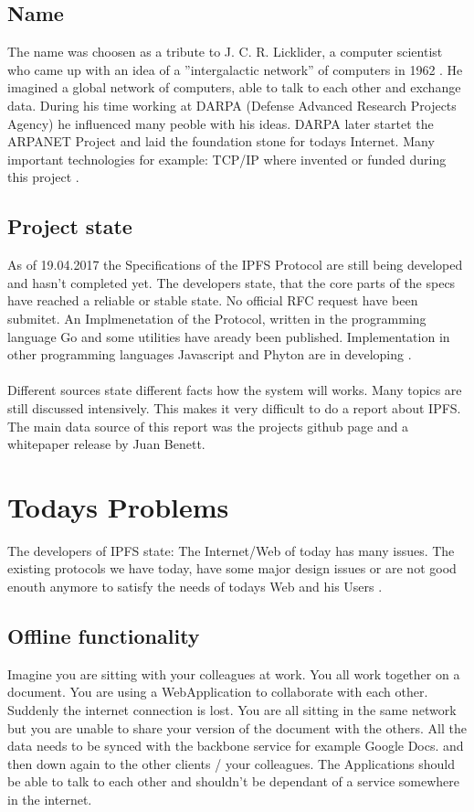 \documentclass[a4paper,11pt, oneside]{report}
\theoremstyle{definition}
\begin{document}
\section{Name}
The name was choosen as a tribute to J. C. R. Licklider, a computer scientist who came up with an idea of a ''intergalactic network'' of computers in 1962 \cite{Tribute}. He imagined a global network of computers, able to talk to each other and exchange data. During his time working at DARPA (Defense Advanced Research Projects Agency) he influenced many peoble with his ideas. DARPA later startet the ARPANET Project and laid the foundation stone for todays Internet. Many important technologies for example: TCP/IP where invented or funded during this project \cite{JCR}. 

\newpage
\section{Project state}
As of 19.04.2017 the Specifications of the IPFS Protocol are still being developed and hasn't completed yet. The developers state, that the
 core parts of the specs have reached a reliable or stable state. No official RFC request have been submitet. An Implmenetation of the Protocol, written in the programming language Go and some utilities have aready been published. Implementation in other programming languages Javascript and Phyton are in developing \cite{specs}.\\ \\
Different sources state different facts how the system will works. Many topics are still discussed intensively. This makes it very difficult to do a report about IPFS. The main data source of this report was the projects github page and a whitepaper release by Juan Benett.

\chapter{Todays Problems}
The developers of IPFS  state: The Internet/Web of today has many issues.  The existing protocols we have today, have some major design issues or are not good enouth anymore to satisfy the needs of todays Web and his Users \cite{TodaysProblems}.


\section{Offline functionality}
Imagine you are sitting with your colleagues at work. You all work together on a document. You are using a WebApplication to collaborate with each other. Suddenly the internet connection is lost. You are all sitting in the same network but you are unable to share your version of the document with the others. All the data needs to be synced with the backbone service for example Google Docs. and then down again to the other clients / your colleagues. The Applications should be able to talk to each other and shouldn't be dependant of a service somewhere in the internet.
\end{document}
